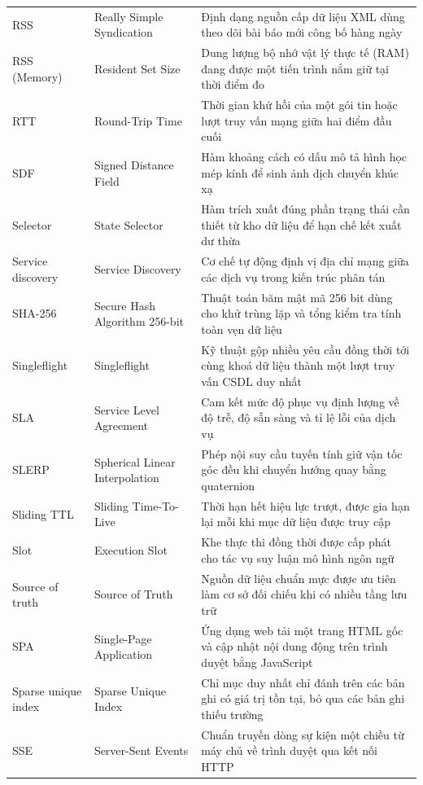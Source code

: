 {\begin{longtable}{@{}>{\raggedright\arraybackslash}p{3.4cm}>{\raggedright\arraybackslash}p{4.7cm}>{\raggedright\arraybackslash}p{7.15cm}@{}}
    RSS & Really Simple Syndication & Định dạng nguồn cấp dữ liệu XML dùng theo dõi bài báo mới công bố hàng ngày \\
    RSS (Memory) & Resident Set Size & Dung lượng bộ nhớ vật lý thực tế (RAM) đang được một tiến trình nắm giữ tại thời điểm đo \\
    RTT & Round-Trip Time & Thời gian khứ hồi của một gói tin hoặc lượt truy vấn mạng giữa hai điểm đầu cuối \\
    SDF & Signed Distance Field & Hàm khoảng cách có dấu mô tả hình học mép kính để sinh ảnh dịch chuyển khúc xạ \\
    Selector & State Selector & Hàm trích xuất đúng phần trạng thái cần thiết từ kho dữ liệu để hạn chế kết xuất dư thừa \\
    Service discovery & Service Discovery & Cơ chế tự động định vị địa chỉ mạng giữa các dịch vụ trong kiến trúc phân tán \\
    SHA-256 & Secure Hash Algorithm 256-bit & Thuật toán băm mật mã 256 bit dùng cho khử trùng lặp và tổng kiểm tra tính toàn vẹn dữ liệu \\
    Singleflight & Singleflight & Kỹ thuật gộp nhiều yêu cầu đồng thời tới cùng khoá dữ liệu thành một lượt truy vấn CSDL duy nhất \\
    SLA & Service Level Agreement & Cam kết mức độ phục vụ định lượng về độ trễ, độ sẵn sàng và tỉ lệ lỗi của dịch vụ \\
    SLERP & Spherical Linear Interpolation & Phép nội suy cầu tuyến tính giữ vận tốc góc đều khi chuyển hướng quay bằng quaternion \\
    Sliding TTL & Sliding Time-To-Live & Thời hạn hết hiệu lực trượt, được gia hạn lại mỗi khi mục dữ liệu được truy cập \\
    Slot & Execution Slot & Khe thực thi đồng thời được cấp phát cho tác vụ suy luận mô hình ngôn ngữ \\
    Source of truth & Source of Truth & Nguồn dữ liệu chuẩn mực được ưu tiên làm cơ sở đối chiếu khi có nhiều tầng lưu trữ \\
    SPA & Single-Page Application & Ứng dụng web tải một trang HTML gốc và cập nhật nội dung động trên trình duyệt bằng JavaScript \\
    Sparse unique index & Sparse Unique Index & Chỉ mục duy nhất chỉ đánh trên các bản ghi có giá trị tồn tại, bỏ qua các bản ghi thiếu trường \\
    SSE & Server-Sent Events & Chuẩn truyền dòng sự kiện một chiều từ máy chủ về trình duyệt qua kết nối HTTP \\

\end{longtable}}
